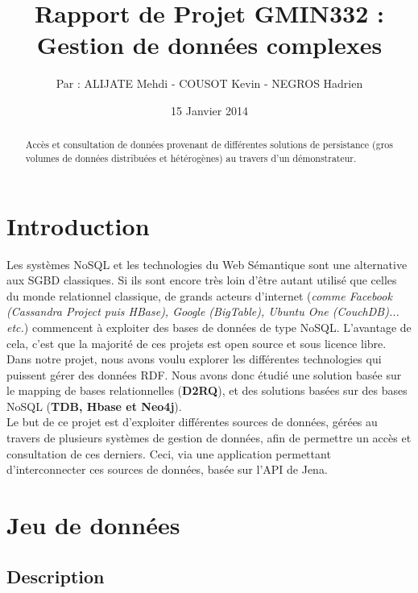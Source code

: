 \documentclass{article}
\title{Rapport de Projet GMIN332 :\\ Gestion de données complexes}
\author{Par : ALIJATE Mehdi - COUSOT Kevin - NEGROS Hadrien}
\date{15 Janvier 2014}
\begin{document}
\maketitle
\tableofcontents

\begin{abstract}
Accès et consultation de données provenant de différentes solutions de persistance (gros volumes de données distribuées et hétérogènes) au travers d'un démonstrateur.
\end{abstract}

\newpage 
\section{Introduction}\label{sec:intro}
Les systèmes NoSQL et les technologies du Web Sémantique sont une alternative aux SGBD classiques. Si ils sont encore très loin d'être autant utilisé que celles du monde relationnel classique, de grands acteurs d'internet (\textit{comme Facebook (Cassandra Project puis HBase), Google (BigTable), Ubuntu One (CouchDB)... etc.}) commencent à exploiter des bases de données de type NoSQL.
L'avantage de cela, c'est que la majorité de ces projets est open source et sous licence libre.
\\
Dans notre projet, nous avons voulu explorer les différentes technologies qui puissent gérer des données RDF. Nous avons donc étudié une solution basée sur le mapping de bases relationnelles (\textbf{D2RQ}), et des solutions basées sur des bases NoSQL (\textbf{TDB, Hbase et Neo4j}).
\\
Le but de ce projet est d'exploiter différentes sources de données, gérées au travers de plusieurs systèmes de gestion de données, afin de permettre un accès et consultation de ces derniers. Ceci, via une application permettant d'interconnecter ces sources de données, basée sur l'API de Jena.


\section{Jeu de données}

\subsection{Description}
\end{document}
